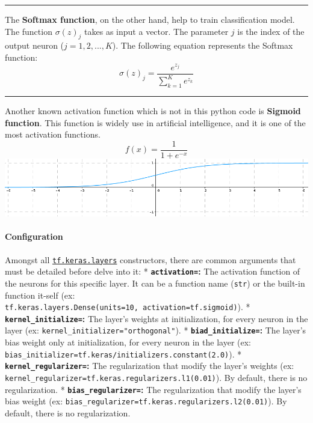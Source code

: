 \documentclass[11pt]{article}
\makeatletter
\def\maxwidth{\ifdim\Gin@nat@width>\linewidth\linewidth
    \else\Gin@nat@width\fi}
\let\Oldincludegraphics\includegraphics
\renewcommand{\includegraphics}[1]{\Oldincludegraphics[width=.8\maxwidth]{#1}}
\makeatother
\begin{document}
\begin{center}\rule{0.5\linewidth}{\linethickness}\end{center}

The \textbf{Softmax function}, on the other hand, help to train
classification model. The function \(\sigma(z)_{j}\) takes as input a
vector. The parameter \(j\) is the index of the output neuron
(\(j = 1, 2, ..., K\)). The following equation represents the Softmax
function: \begin{equation*}
\sigma(z)_{j} = \frac{e^{z_{j}}}{\sum_{k=1}^{K} e^{z_k}}
\end{equation*}

\begin{center}\rule{0.5\linewidth}{\linethickness}\end{center}

Another known activation function which is not in this python code is
\textbf{Sigmoid function}. This function is widely use in artificial
intelligence, and it is one of the most activation functions.
\begin{equation*}
f(x) = \frac{1}{1 + e^{-x}}
\end{equation*} \includegraphics{../../../../../res/images/sigmoid.png}

    \hypertarget{configuration}{%
\paragraph{Configuration}\label{configuration}}

    Amongst all
\href{https://www.tensorflow.org/api_docs/python/tf/keras/layers}{\texttt{tf.keras.layers}}
constructors, there are common arguments that must be detailed before
delve into it: * \textbf{\texttt{activation=}:} The activation function
of the neurons for this specific layer. It can be a function name
(\texttt{str}) or the built-in function it-self (ex:
\texttt{tf.keras.layers.Dense(units=10,\ activation=tf.sigmoid)}). *
\textbf{\texttt{kernel\_initialize=}:} The layer's weights at
initialization, for every neuron in the layer (ex:
\texttt{kernel\_initializer="orthogonal"}). *
\textbf{\texttt{biad\_initialize=}:} The layer's bias weight only at
initialization, for every neuron in the layer (ex:
\texttt{bias\_initializer=tf.keras/initializers.constant(2.0)}). *
\textbf{\texttt{kernel\_regularizer=}:} The regularization that modify
the layer's weights (ex:
\texttt{kernel\_regularizer=tf.keras.regularizers.l1(0.01)}). By
default, there is no regularization. *
\textbf{\texttt{bias\_regularizer=}:} The regularization that modify the
layer's bias weight (ex:
\texttt{bias\_regularizer=tf.keras.regularizers.l2(0.01)}). By default,
there is no regularization.
\end{document}
